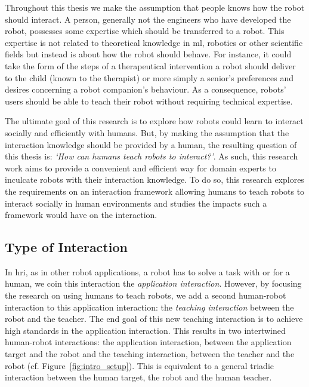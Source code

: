 Throughout this thesis we make the assumption that people knows how the robot should interact. A person, generally not the engineers who have developed the robot, possesses some expertise which should be transferred to a robot. This expertise is not related to theoretical knowledge in \gls{ml}, robotics or other scientific fields but instead is about how the robot should behave. For instance,  it could take the form of the steps of a therapeutical intervention a robot should deliver to the child (known to the therapist) or more simply a senior's preferences and desires concerning a robot companion's behaviour. As a consequence, robots' users should be able to teach their robot %
 without requiring technical expertise.

The ultimate goal of this research is to explore how robots could learn to interact socially and efficiently with humans. But, by making the assumption that the interaction knowledge should be provided by a human, the resulting question of this thesis is: \emph{`How can humans teach robots to interact?'}. As such, this research work aims to provide a convenient and efficient way for domain experts to inculcate robots with their interaction knowledge. To do so, this research explores the requirements on an interaction framework allowing humans to teach robots to interact socially in human environments and studies the impacts such a framework would have on the interaction.

\subsection{Type of Interaction}
In \gls{hri}, as in other robot applications, a robot has to solve a task with or for a human, we coin this interaction the \emph{application interaction}. However, by focusing the research on using humans to teach robots, we add a second human-robot interaction to this application interaction: the \emph{teaching interaction} between the robot and the teacher. The end goal of this new teaching interaction is to achieve high standards in the application interaction. This results in two intertwined human-robot interactions: the application interaction, between the application target and the robot and the teaching interaction, between the teacher and the robot (cf. Figure~\ref{fig:intro_setup}). This is equivalent to a general triadic interaction between the human target, the robot and the human teacher.

